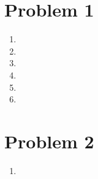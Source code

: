 \documentclass{article}
\begin{document}
\section{Problem 1}
\begin{enumerate}
\item
\item
\item
\item
\item
\item
\end{enumerate}
\section{Problem 2}
\begin{enumerate}
\item
\end{enumerate}
\end{document}
